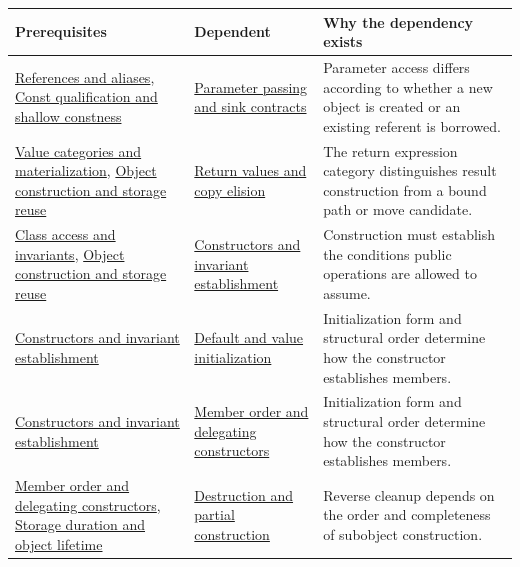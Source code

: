 {\def\LTcaptype{none} %
\begin{longtable}[]{@{}
  >{\raggedright\arraybackslash}p{}
  >{\raggedright\arraybackslash}p{}
  >{\raggedright\arraybackslash}p{}@{}}
\toprule\noalign{}
\begin{minipage}[b]{\linewidth}\raggedright
Prerequisites
\end{minipage} & \begin{minipage}[b]{\linewidth}\raggedright
Dependent
\end{minipage} & \begin{minipage}[b]{\linewidth}\raggedright
Why the dependency exists
\end{minipage} \\
\midrule\noalign{}
\endhead
\bottomrule\noalign{}
\endlastfoot
\hyperref[appendix-d6d562ca9fbb]{References and aliases}, \hyperref[appendix-c25d60fed375]{Const qualification and shallow constness} & \hyperref[appendix-d5908f75721f]{Parameter passing and sink contracts} & Parameter access differs according to whether a new object is created or an existing referent is borrowed. \\
\hyperref[appendix-1121b30eaeb0]{Value categories and materialization}, \hyperref[appendix-a82f9c438857]{Object construction and storage reuse} & \hyperref[appendix-b08d3788c5c6]{Return values and copy elision} & The return expression category distinguishes result construction from a bound path or move candidate. \\
\hyperref[appendix-8e5214819615]{Class access and invariants}, \hyperref[appendix-a82f9c438857]{Object construction and storage reuse} & \hyperref[appendix-7f8ec83d0886]{Constructors and invariant establishment} & Construction must establish the conditions public operations are allowed to assume. \\
\hyperref[appendix-7f8ec83d0886]{Constructors and invariant establishment} & \hyperref[appendix-ba8c1a9fe03f]{Default and value initialization} & Initialization form and structural order determine how the constructor establishes members. \\
\hyperref[appendix-7f8ec83d0886]{Constructors and invariant establishment} & \hyperref[appendix-3cb49709605a]{Member order and delegating constructors} & Initialization form and structural order determine how the constructor establishes members. \\
\hyperref[appendix-3cb49709605a]{Member order and delegating constructors}, \hyperref[appendix-0b104bcba06b]{Storage duration and object lifetime} & \hyperref[appendix-9bfe377cef7a]{Destruction and partial construction} & Reverse cleanup depends on the order and completeness of subobject construction. \\

\end{longtable}}
